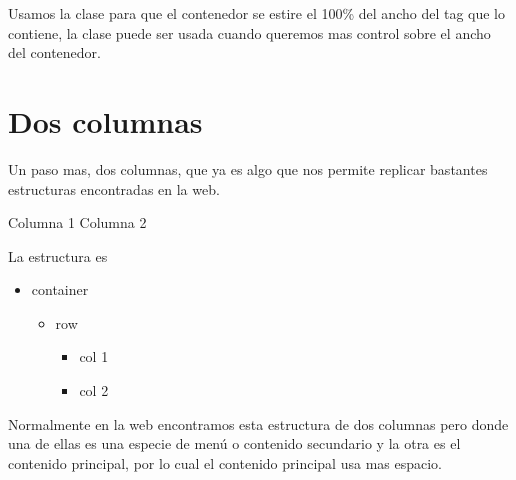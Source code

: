 \documentclass[letterpaper,10pt,spanish]{sphinxmanual}
\begin{document}
Usamos la clase  para que el contenedor se estire el 100\% del
ancho del tag que lo contiene, la clase  puede ser usada cuando
queremos mas control sobre el ancho del contenedor.


\section{Dos columnas}
\label{\detokenize{filas-columnas:dos-columnas}}
Un paso mas, dos columnas, que ya es algo que nos permite replicar bastantes
estructuras encontradas en la web.

%
\begin{sphinxVerbatim}[commandchars=\\\{\}]
 
  
   
    Columna 1
   
    Columna 2
\end{sphinxVerbatim}



La estructura es
\begin{itemize}
\item {} 
container
\begin{itemize}
\item {} 
row
\begin{itemize}
\item {} 
col 1

\item {} 
col 2

\end{itemize}

\end{itemize}

\end{itemize}

Normalmente en la web encontramos esta estructura de dos columnas pero donde
una de ellas es una especie de menú o contenido secundario y la otra es el
contenido principal, por lo cual el contenido principal usa mas espacio.
\end{document}
